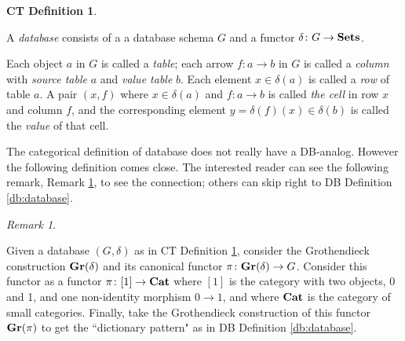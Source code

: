 \documentclass{amsart}
\def\to{\rightarrow}
\def\taking{\colon}
\def\Cat{{\bf Cat}}
\def\Sets{{\bf Sets}}
\theoremstyle{remark}
\newtheorem{remark}[theorem]{Remark}
\theoremstyle{definition}
\newtheorem{ctdef}{CT Definition}
\def\Gr{{\bf Gr}}
\begin{document}
\begin{ctdef}\label{ct:database}

A {\em database} consists of a a database schema $G$ and a functor $\delta\taking G\to\Sets$.  

Each object $a$ in $G$ is called a {\em table}; each arrow $f\taking a\to b$ in $G$ is called a {\em column} with {\em source table} $a$ and {\em value table} $b$.  Each element $x\in\delta(a)$ is called a {\em row} of table $a$.  A pair $(x,f)$ where $x\in\delta(a)$ and $f\taking a\to b$ is called {\em the cell} in row $x$ and column $f$, and the corresponding element $y=\delta(f)(x)\in\delta(b)$ is called the {\em value} of that cell.

\end{ctdef}

The categorical definition of database does not really have a DB-analog.  However the following definition comes close.  The interested reader can see the following remark, Remark \ref{rem:grothendieck}, to see the connection; others can skip right to DB Definition \ref{db:database}.

\begin{remark}\label{rem:grothendieck}

Given a database $(G,\delta)$ as in CT Definition \ref{ct:database}, consider the Grothendieck construction $\Gr(\delta)$ and its canonical functor $\pi\taking\Gr(\delta)\to G$.  Consider this functor as a functor $\pi\taking[1]\to\Cat$ where $[1]$ is the category with two objects, 0 and 1, and one non-identity morphism $0\to 1$, and where $\Cat$ is the category of small categories.  Finally, take the Grothendieck construction of this functor $\Gr(\pi)$ to get the ``dictionary pattern" as in DB Definition \ref{db:database}.

\end{remark}
\end{document}
